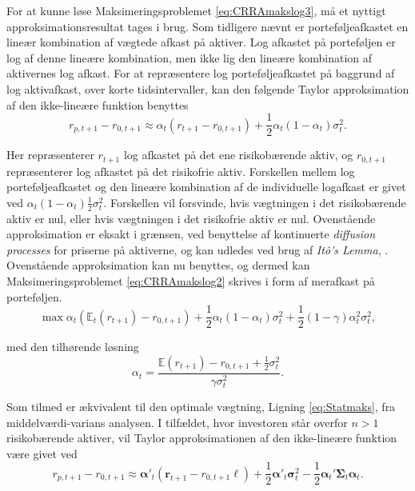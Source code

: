 \documentclass[
  a4paper,
  oneside]{memoir}
\begin{document}
For at kunne løse Maksimeringsproblemet \eqref{eq:CRRAmakslog3}, må et nyttigt approksimationsresultat tages i brug. Som tidligere nævnt er porteføljeafkastet en lineær kombination af vægtede afkast på aktiver. Log afkastet på porteføljen er log af denne lineære kombination, men ikke lig den lineære kombination af aktivernes log afkast. For at repræsentere log porteføljeafkastet på baggrund af log aktivafkast, over korte tidsintervaller, kan den følgende Taylor approksimation af den ikke-lineære funktion benyttes
\[r_{p,t+1}-r_{0,t+1}\approx \alpha_t (r_{t+1}-r_{0,t+1})+\frac{1}{2}\alpha_t(1-\alpha_t)\sigma_t^2.\]

Her repræsenterer \(r_{t+1}\) log afkastet på det ene risikobærende aktiv, og \(r_{0,t+1}\) repræsenterer log afkastet på det risikofrie aktiv. Forskellen mellem log porteføljeafkastet og den lineære kombination af de individuelle logafkast er givet ved \(\alpha_t(1-\alpha_t)\tfrac{1}{2}\sigma_t^2\). Forskellen vil forsvinde, hvis vægtningen i det risikobærende aktiv er nul, eller hvis vægtningen i det risikofrie aktiv er nul. Ovenstående approksimation er eksakt i grænsen, ved benyttelse af kontinuerte \emph{diffusion processes} for priserne på aktiverne, og kan udledes ved brug af \emph{Itô's Lemma}, \citep{CampVicCha2003}. Ovenstående approksimation kan nu benyttes, og dermed kan Maksimeringsproblemet \eqref{eq:CRRAmakslog2} skrives i form af merafkast på porteføljen.
\begin{equation}
\max\alpha_t(\mathbb{E}_t(r_{t+1}) - r_{0,t+1}) + \frac{1}{2}\alpha_t(1-\alpha_t)\sigma_t^2 + \frac{1}{2}(1-\gamma)\alpha_t^2\sigma_t^2, \label{eq:CRRAmakslog4} 
\end{equation}

med den tilhørende løsning
\begin{equation}
\alpha_t=\frac{\mathbb{E}(r_{t+1}) - r_{0,t+1}+\frac{1}{2}\sigma_t^2}{\gamma\sigma_t^2}.
\end{equation}

Som tilmed er ækvivalent til den optimale vægtning, Ligning \eqref{eq:Statmaks}, fra middelværdi-varians analysen. I tilfældet, hvor investoren står overfor \(n>1\) risikobærende aktiver, vil Taylor approksimationen af den ikke-lineære funktion være givet ved
\begin{equation}
r_{p,t+1}-r_{0,t+1}\approx \bm{\alpha}'_t (\bm{r}_{t+1}-r_{0,t+1}\bm{\ell})+\frac{1}{2}\bm{\alpha}'_t\bm{\sigma}_t^2 - \frac{1}{2} \bm{\alpha}_t'\bm{\Sigma}_t\bm{\alpha}_t. \label{eq:Multtaylor}
\end{equation}
\end{document}
